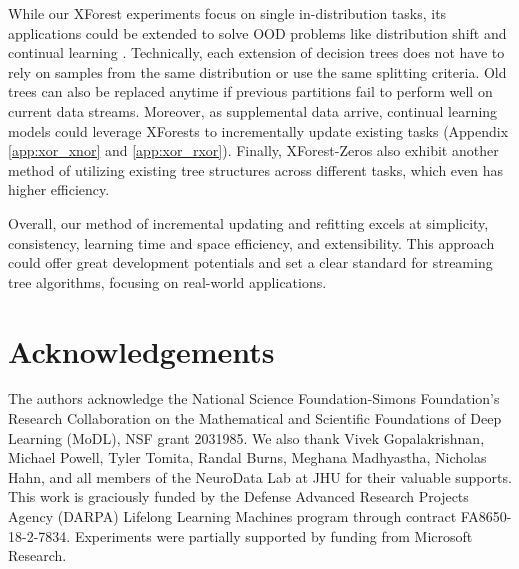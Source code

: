 While our XForest experiments focus on single in-distribution tasks, its applications could be extended to solve OOD problems like distribution shift and continual learning \citep{geisa_towards_2021, van_de_ven_three_2019}. 
Technically, each extension of decision trees does not have to rely on samples from the same distribution or use the same splitting criteria. Old trees can also be replaced anytime if previous partitions fail to perform well on current data streams. Moreover, as supplemental data arrive, continual learning models could leverage XForests to incrementally update existing tasks (Appendix \ref{app:xor_xnor} and \ref{app:xor_rxor}).
Finally, XForest-Zeros also exhibit another method of utilizing existing tree structures across different tasks, which even has higher efficiency.

Overall, our method of incremental updating and refitting excels at simplicity, consistency, learning time and space efficiency, and extensibility. This approach could offer great development potentials and set a clear standard for streaming tree algorithms, focusing on real-world applications.

\section*{Acknowledgements}
The authors acknowledge the National Science Foundation-Simons Foundation’s Research Collaboration on the Mathematical and Scientific Foundations of Deep Learning (MoDL), NSF grant 2031985. We also thank Vivek Gopalakrishnan, Michael Powell, Tyler Tomita, Randal Burns, Meghana Madhyastha, Nicholas Hahn, and all members of the NeuroData Lab at JHU for their valuable supports. This work is graciously funded by the Defense Advanced Research Projects Agency (DARPA) Lifelong Learning Machines program through contract FA8650-18-2-7834. Experiments were partially supported by funding from Microsoft Research.